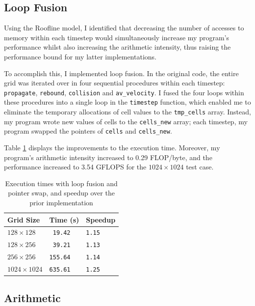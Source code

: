 \documentclass[twocolumn, a4paper]{article}
\begin{document}
\subsection{Loop Fusion}

Using the Roofline model, I identified that decreasing the number of accesses to memory within each timestep would simultaneously increase my program's performance whilst also increasing the arithmetic intensity, thus raising the performance bound for my latter implementations. 

To accomplish this, I implemented loop fusion.
In the original code, the entire grid was iterated over in four sequential procedures within each timestep: \texttt{propagate}, \texttt{rebound}, \texttt{collision} and \texttt{av\_velocity}.
I fused the four loops within these procedures into a single loop in the \texttt{timestep} function, which enabled me to eliminate the temporary allocations of cell values to the \texttt{tmp\_cells} array.
Instead, my program wrote new values of cells to the \texttt{cells\_new} array; each timestep, my program swapped the pointers of \texttt{cells} and \texttt{cells\_new}.

Table \ref{tab:loop_fusion_pointer_swap} displays the improvements to the execution time.
Moreover, my program's arithmetic intensity increased to 0.29 FLOP/byte, and the performance increased to 3.54 GFLOPS for the $1024 \times 1024$ test case.

\begin{table}[htbp]
  \begin{center}
  \caption{Execution times with loop fusion and pointer swap, and speedup over the prior implementation}\label{tab:loop_fusion_pointer_swap}
  \begin{tabular}[t]{l | l l} 
      \hline\hline
      Grid Size&Time (s)&Speedup\\
      \hline
      $128 \times 128$&\texttt{ 19.42}&\texttt{1.15}\\
      $128 \times 256$&\texttt{ 39.21}&\texttt{1.13}\\
      $256 \times 256$&\texttt{155.64}&\texttt{1.14}\\
      $1024 \times 1024$&\texttt{635.61}&\texttt{1.25}\\
      \hline
    \end{tabular}
  \end{center}
  \vspace{-1em}
\end{table}

\subsection{Arithmetic}
\end{document}
